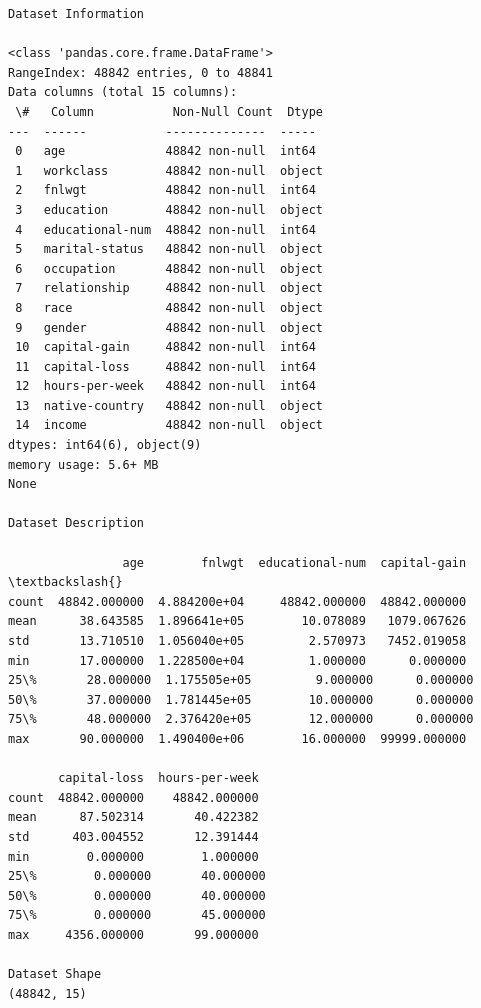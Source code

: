 \documentclass[11pt]{article}
\begin{document}
\begin{Verbatim}[commandchars=\\\{\}]
Dataset Information

<class 'pandas.core.frame.DataFrame'>
RangeIndex: 48842 entries, 0 to 48841
Data columns (total 15 columns):
 \#   Column           Non-Null Count  Dtype
---  ------           --------------  -----
 0   age              48842 non-null  int64
 1   workclass        48842 non-null  object
 2   fnlwgt           48842 non-null  int64
 3   education        48842 non-null  object
 4   educational-num  48842 non-null  int64
 5   marital-status   48842 non-null  object
 6   occupation       48842 non-null  object
 7   relationship     48842 non-null  object
 8   race             48842 non-null  object
 9   gender           48842 non-null  object
 10  capital-gain     48842 non-null  int64
 11  capital-loss     48842 non-null  int64
 12  hours-per-week   48842 non-null  int64
 13  native-country   48842 non-null  object
 14  income           48842 non-null  object
dtypes: int64(6), object(9)
memory usage: 5.6+ MB
None

Dataset Description

                age        fnlwgt  educational-num  capital-gain  \textbackslash{}
count  48842.000000  4.884200e+04     48842.000000  48842.000000
mean      38.643585  1.896641e+05        10.078089   1079.067626
std       13.710510  1.056040e+05         2.570973   7452.019058
min       17.000000  1.228500e+04         1.000000      0.000000
25\%       28.000000  1.175505e+05         9.000000      0.000000
50\%       37.000000  1.781445e+05        10.000000      0.000000
75\%       48.000000  2.376420e+05        12.000000      0.000000
max       90.000000  1.490400e+06        16.000000  99999.000000

       capital-loss  hours-per-week
count  48842.000000    48842.000000
mean      87.502314       40.422382
std      403.004552       12.391444
min        0.000000        1.000000
25\%        0.000000       40.000000
50\%        0.000000       40.000000
75\%        0.000000       45.000000
max     4356.000000       99.000000

Dataset Shape
(48842, 15)
    \end{Verbatim}
\end{document}
